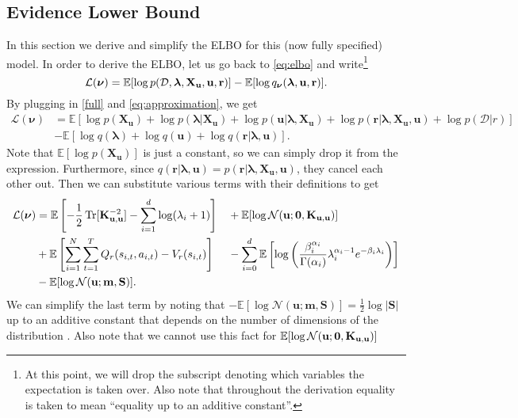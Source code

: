 \documentclass{mprop}
\theoremstyle{definition}
\DeclareMathOperator{\Tr}{Tr}
\begin{document}
\subsection{Evidence Lower Bound}

In this section we derive and simplify the ELBO for this (now fully specified)
model. In order to derive the ELBO, let us go back to \eqref{eq:elbo} and
write\footnote{At this point, we will drop the subscript denoting which
  variables the expectation is taken over. Also note that throughout the derivation
  equality is taken to mean ``equality up to an additive constant''.}
\[ \mathcal{L}(\bm\nu) = \mathbb{E}[\log p(\mathcal{D}, \bm\lambda, \mathbf{X_u}, \mathbf{u}, \mathbf{r})] -
  \mathbb{E}[\log q_{\bm\nu}(\bm\lambda, \mathbf{u}, \mathbf{r})]. \]
By plugging in \eqref{full} and \eqref{eq:approximation}, we get
\[
  \begin{split}
    \mathcal{L}(\bm\nu) &= \mathbb{E}[\log p(\mathbf{X_u}) + \log p(\bm\lambda |
    \mathbf{X_u}) + \log p(\mathbf{u} | \bm\lambda, \mathbf{X_u}) + \log
    p(\mathbf{r} | \bm\lambda, \mathbf{X_u}, \mathbf{u}) + \log p(\mathcal{D} | r)] \\
    &- \mathbb{E}[\log q(\bm\lambda) + \log q(\mathbf{u}) + \log q(\mathbf{r} |
    \bm\lambda, \mathbf{u})].
  \end{split}
\]
Note that $\mathbb{E}[\log p(\mathbf{X_u})]$ is just a constant, so we can
simply drop it from the expression. Furthermore, since $q(\mathbf{r} | \bm\lambda,
\mathbf{u}) = p(\mathbf{r} | \bm\lambda, \mathbf{X_u}, \mathbf{u})$, they cancel
each other out. Then we can substitute various terms with their definitions to
get
\begin{alignat*}{3}
  \mathcal{L}(\bm\nu) &= \mathbb{E}\left[-\frac{1}{2}\Tr[\Kuu^{-2}] -
    \sum_{i=1}^d \log(\lambda_i + 1)\right] &&+ \mathbb{E}[\log
  \mathcal{N}(\mathbf{u}; \mathbf{0}, \Kuu)] \\
  &+ \mathbb{E}\left[ \sum_{i=1}^N \sum_{t=1}^T Q_r(s_{i,t}, a_{i,t}) -
    V_r(s_{i,t}) \right] &&-
  \sum_{i=0}^d\mathbb{E}\left[\log\left(\frac{\beta_i^{\alpha_i}}{\Gamma(\alpha_i)}\lambda_i^{\alpha_i
        - 1}e^{-\beta_i\lambda_i}\right)\right] \\
  &-
  \mathbb{E}[\log\mathcal{N}(\mathbf{u}; \mathbf{m}, \mathbf{S})].
\end{alignat*}
We can simplify the last term by noting that $-\mathbb{E}[\log
\mathcal{N}(\mathbf{u}; \mathbf{m}, \mathbf{S})] = \frac{1}{2}\log|\mathbf{S}|$
up to an additive constant that depends on the number of dimensions of the
distribution \cite{DBLP:journals/tit/AhmedG89}. Also note that we cannot use
this fact for $\mathbb{E}[\log \mathcal{N}(\mathbf{u}; \mathbf{0}, \mathbf{K}_{\mathbf{u},\mathbf{u}})]$
\end{document}
